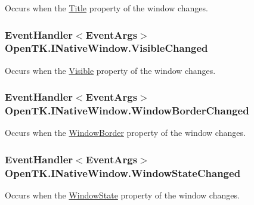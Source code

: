 Occurs when the \hyperlink{interface_open_t_k_1_1_i_native_window_acc6e79eb06f9e7d725f6eac5ac1df71d}{Title} property of the window changes. 

\hypertarget{interface_open_t_k_1_1_i_native_window_a848de842c644e1c4066e87e16dca3555}{
\subsubsection[{Visible\-Changed}]{\setlength{\rightskip}{0pt plus 5cm}Event\-Handler$<$Event\-Args$>$ Open\-T\-K.\-I\-Native\-Window.\-Visible\-Changed}}\label{interface_open_t_k_1_1_i_native_window_a848de842c644e1c4066e87e16dca3555}


Occurs when the \hyperlink{interface_open_t_k_1_1_i_native_window_ac455c50c69983d4a26e7ed61336290d8}{Visible} property of the window changes. 

\hypertarget{interface_open_t_k_1_1_i_native_window_a31bb2ed82c8646aee97bda920ef92aae}{
\subsubsection[{Window\-Border\-Changed}]{\setlength{\rightskip}{0pt plus 5cm}Event\-Handler$<$Event\-Args$>$ Open\-T\-K.\-I\-Native\-Window.\-Window\-Border\-Changed}}\label{interface_open_t_k_1_1_i_native_window_a31bb2ed82c8646aee97bda920ef92aae}


Occurs when the \hyperlink{interface_open_t_k_1_1_i_native_window_afb974cc1ffb686860725736bd07c2211}{Window\-Border} property of the window changes. 

\hypertarget{interface_open_t_k_1_1_i_native_window_ae13b78b7d872ee1a62950a8b6b5983b8}{
\subsubsection[{Window\-State\-Changed}]{\setlength{\rightskip}{0pt plus 5cm}Event\-Handler$<$Event\-Args$>$ Open\-T\-K.\-I\-Native\-Window.\-Window\-State\-Changed}}\label{interface_open_t_k_1_1_i_native_window_ae13b78b7d872ee1a62950a8b6b5983b8}


Occurs when the \hyperlink{interface_open_t_k_1_1_i_native_window_a228db8bdb7282c03e98c103bc6ea9904}{Window\-State} property of the window changes. 

